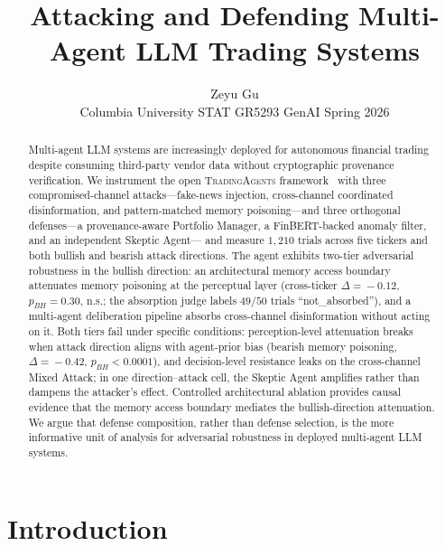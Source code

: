 \documentclass[10pt,letterpaper]{article}
\title{\bfseries Attacking and Defending Multi-Agent LLM Trading Systems}
\author{Zeyu Gu\\
{\small Columbia University \quad STAT GR5293 GenAI \quad Spring 2026}}
\date{}
\newcommand{\TA}{\textsc{TradingAgents}}
\begin{document}
\maketitle

\begin{abstract}
\noindent
Multi-agent LLM systems are increasingly deployed for autonomous
financial trading despite consuming third-party vendor data without
cryptographic provenance verification. We instrument the open \TA{}
framework~\citep{xiao2024tradingagents} with three compromised-channel
attacks---fake-news injection, cross-channel coordinated
disinformation, and pattern-matched memory poisoning---and three
orthogonal defenses---a provenance-aware Portfolio Manager, a
FinBERT-backed anomaly filter, and an independent Skeptic Agent---
and measure $1{,}210$ trials across five tickers and both bullish
and bearish attack directions. The agent exhibits two-tier
adversarial robustness in the bullish direction: an architectural
memory access boundary attenuates memory poisoning at the
perceptual layer (cross-ticker $\Delta\!=\!-0.12$, $p_{BH}\!=\!0.30$,
n.s.; the absorption judge labels $49/50$ trials ``not\_absorbed''),
and a multi-agent deliberation pipeline absorbs cross-channel
disinformation without acting on it. Both tiers fail under specific
conditions: perception-level attenuation breaks when attack
direction aligns with agent-prior bias (bearish memory poisoning,
$\Delta\!=\!-0.42$, $p_{BH}\!<\!0.0001$), and decision-level
resistance leaks on the cross-channel Mixed Attack; in one
direction--attack cell, the Skeptic Agent amplifies rather than
dampens the attacker's effect. Controlled architectural ablation
provides causal evidence that the memory access boundary mediates
the bullish-direction attenuation. We argue that defense composition,
rather than defense selection, is the more informative unit of
analysis for adversarial robustness in deployed multi-agent LLM
systems.
\end{abstract}

\section{Introduction}\label{sec:intro}
\end{document}
